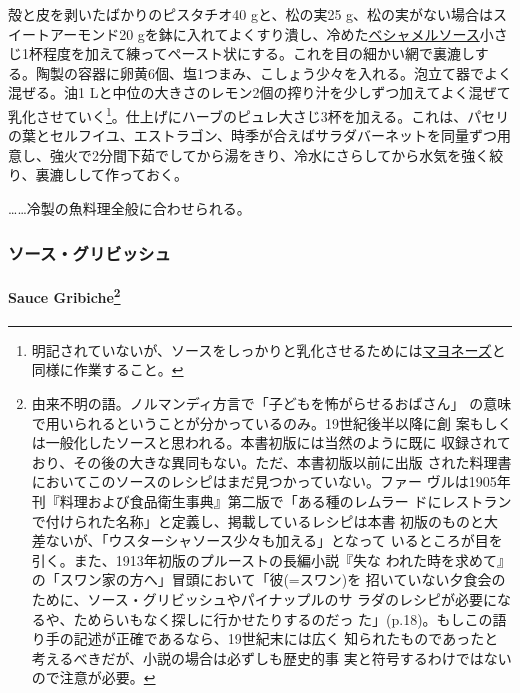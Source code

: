 \begin{recette}
殻と皮を剥いたばかりのピスタチオ40 gと、松の実25
g、松の実がない場合はスイートアーモンド20
gを鉢に入れてよくすり潰し、冷めた\protect\hyperlink{sauce-bechamel}{ベシャメルソース}小さじ1杯程度を加えて練ってペースト状にする。これを目の細かい網で裏漉しする。陶製の容器に卵黄6個、塩1つまみ、こしょう少々を入れる。泡立て器でよく混ぜる。油1
Lと中位の大きさのレモン2個の搾り汁を少しずつ加えてよく混ぜて乳化させていく\footnote{明記されていないが、ソースをしっかりと乳化させるためには\protect\hyperlink{mayonnaise}{マヨネーズ}と同様に作業すること。}。仕上げにハーブのピュレ大さじ3杯を加える。これは、パセリの葉とセルフイユ、エストラゴン、時季が合えばサラダバーネットを同量ずつ用意し、強火で2分間下茹でしてから湯をきり、冷水にさらしてから水気を強く絞り、裏漉しして作っておく。

\ldots{}\ldots{}冷製の魚料理全般に合わせられる。

\maeaki

\hypertarget{ux30bdux30fcux30b9ux30b0ux30eaux30d3ux30c3ux30b7ux30e5}{%
\subsubsection{ソース・グリビッシュ}\label{ux30bdux30fcux30b9ux30b0ux30eaux30d3ux30c3ux30b7ux30e5}}

\hypertarget{sauce-gribiche}{%
\paragraph[Sauce Gribiche]{\texorpdfstring{Sauce Gribiche\footnote{由来不明の語。ノルマンディ方言で「子どもを怖がらせるおばさん」
  の意味で用いられるということが分かっているのみ。19世紀後半以降に創
  案もしくは一般化したソースと思われる。本書初版には当然のように既に
  収録されており、その後の大きな異同もない。ただ、本書初版以前に出版
  された料理書においてこのソースのレシピはまだ見つかっていない。ファー
  ヴルは1905年刊『料理および食品衛生事典』第二版で「ある種のレムラー
  ドにレストランで付けられた名称」と定義し、掲載しているレシピは本書
  初版のものと大差ないが、「ウスターシャソース少々も加える」となって
  いるところが目を引く。また、1913年初版のプルーストの長編小説『失な
  われた時を求めて』の「スワン家の方へ」冒頭において「彼(=スワン)を
  招いていない夕食会のために、ソース・グリビッシュやパイナップルのサ
  ラダのレシピが必要になるや、ためらいもなく探しに行かせたりするのだっ
  た」(p.18)。もしこの語り手の記述が正確であるなら、19世紀末には広く
  知られたものであったと考えるべきだが、小説の場合は必ずしも歴史的事
  実と符号するわけではないので注意が必要。}}{Sauce Gribiche}}\label{sauce-gribiche}}


\end{recette}

